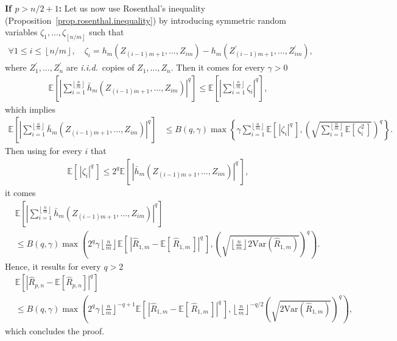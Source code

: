 \documentclass[twoside,11pt]{article}
\numberwithin{equation}{section}
\newcommand{\esp}[1]{\mathbb{E}\left[#1 \right]}
\newcommand{\floor}[1]{\left\lfloor #1 \right\rfloor}
\newcommand{\1}{\mathds{1}}%
\newcommand{\paren}[1]{\left( #1 \right)}
\newcommand{\croch}[1]{\left[\, #1 \,\right]}
\newcommand{\acc}[1]{\left\{ #1 \right\}}
\newcommand{\abs}[1]{\left\lvert #1 \right\rvert} %
\newcommand{\iid}{\textit{i.i.d.}\ }
\newcommand{\E}{\mathbb{E}}
\newcommand{\Var}{\mathrm{Var}}
\newcommand{\Rh}{\widehat{R}}
\numberwithin{equation}{section}
\theoremstyle{plain}
\begin{document}
\noindent\textbf{If $p> n/2+1$:}
%
Let us now use Rosenthal's inequality (Proposition~\ref{prop.rosenthal.inequality}) by introducing symmetric random variables $\zeta_1,\ldots,\zeta_{\floor{n/m}}$ such that
\begin{align*}
\forall 1\leq i\leq \floor{n/m}, \quad \zeta_i =  h_m\paren{ Z_{(i-1)m+1},\ldots,Z_{im}} - h_m\paren{ Z^\prime_{(i-1)m+1},\ldots,Z^\prime_{im}},
\end{align*}
where $Z^\prime_1,\ldots,Z^\prime_n$ are \iid copies of $Z_1,\ldots,Z_n$.
%
Then it comes for every $\gamma>0$
\begin{align*}
\esp{ \abs{ \sum_{i = 1} ^{\floor{ \frac{n}{m}}}  \bar h_m\paren{ Z_{(i-1)m+1},\ldots,Z_{im}} }^{q}  }  \leq \esp{ \abs{ \sum_{i = 1} ^{\floor{ \frac{n}{m}}}  \zeta_i }^{q}  } ,
\end{align*}
%
which implies
\begin{align*}
\esp{ \abs{ \sum_{i = 1} ^{\floor{ \frac{n}{m}}}  \bar h_m\paren{ Z_{(i-1)m+1},\ldots,Z_{im}} }^{q}  }
%
& \leq B(q,\gamma) \max\acc{ \gamma \sum_{i = 1} ^{\floor{ \frac{n}{m}}}  \E\croch{ \abs{ \zeta_i }^q } , \paren{ \sqrt{ \sum_{i = 1} ^{\floor{ \frac{n}{m}}} \E\croch{ \zeta_i^2 } } }^q } .
%
\end{align*}
Then using for every $i$ that
\begin{align*}
\E\croch{\abs{\zeta_i}^q }\leq 2^{q} \E\croch{ \abs{ \bar h_m\paren{ Z_{(i-1)m+1},\ldots,Z_{im}}}^q} ,
\end{align*}
it comes
\begin{align*}
& \esp{ \abs{ \sum_{i = 1} ^{\floor{ \frac{n}{m}}}  \bar h_m\paren{ Z_{(i-1)m+1},\ldots,Z_{im}} }^{q}  } \\
%
& \leq B(q,\gamma) \max\left(  2^q \gamma \floor{ \frac{n}{m}}  \E\croch{ \abs{ \Rh_{1,m} - \E\croch{ \Rh_{1,m} } }^q } , \paren{ \sqrt{ \floor{ \frac{n}{m}} 2 \Var\paren{  \Rh_{1,m} } } }^q \right) .
\end{align*}
%
Hence, it results for every $q>2$
\begin{align*}
&\esp{ \abs{ \Rh_{p,n} - \esp{\Rh_{p,n}} }^{q} } \\
%
 & \leq  B(q,\gamma) \max \left(  2^q \gamma \floor{ \frac{n}{m}}^{-q+1}  \E\croch{ \abs{ \Rh_{1,m} - \E\croch{ \Rh_{1,m} } }^q } , \floor{ \frac{n}{m}}^{-q/2} \paren{ \sqrt{ 2 \Var\paren{  \Rh_{1,m} } } }^q \right) ,
\end{align*}
which concludes the proof.
\end{document}
